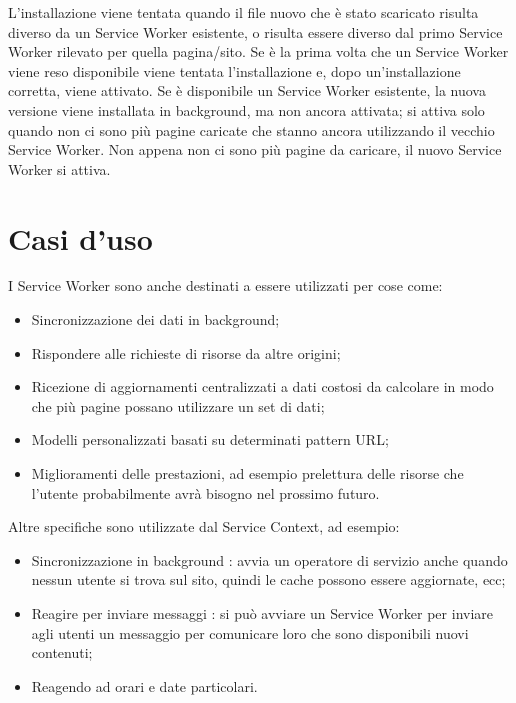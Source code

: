\documentclass[italian]{article}
\begin{document}
L'installazione viene tentata quando il file nuovo che è stato scaricato risulta diverso da un Service Worker esistente, o risulta essere diverso dal primo Service Worker rilevato per quella pagina/sito. Se è la prima volta che un Service Worker viene reso disponibile viene tentata l'installazione e, dopo un'installazione corretta, viene attivato. Se è disponibile un Service Worker esistente, la nuova versione viene installata in background, ma non ancora attivata; si attiva solo quando non ci sono più pagine caricate che stanno ancora utilizzando il vecchio Service Worker. Non appena non ci sono più pagine da caricare, il nuovo Service Worker si attiva.

\section{Casi d'uso}
I Service Worker sono anche destinati a essere utilizzati per cose come:
\begin{itemize}
\item Sincronizzazione dei dati in background;
\item Rispondere alle richieste di risorse da altre origini;
\item Ricezione di aggiornamenti centralizzati a dati costosi da calcolare in modo che più pagine possano utilizzare un set di dati;
\item Modelli personalizzati basati su determinati pattern URL;
\item Miglioramenti delle prestazioni, ad esempio prelettura delle risorse che l'utente probabilmente avrà bisogno nel prossimo futuro.
\end{itemize}
Altre specifiche sono utilizzate dal Service Context, ad esempio:
\begin{itemize}
\item Sincronizzazione in background : avvia un operatore di servizio anche quando nessun utente si trova sul sito, quindi le cache possono essere aggiornate, ecc;
\item Reagire per inviare messaggi : si può avviare un Service Worker per inviare agli utenti un messaggio per comunicare loro che sono disponibili nuovi contenuti;
\item Reagendo ad orari e date particolari.
\end{itemize}
\end{document}
